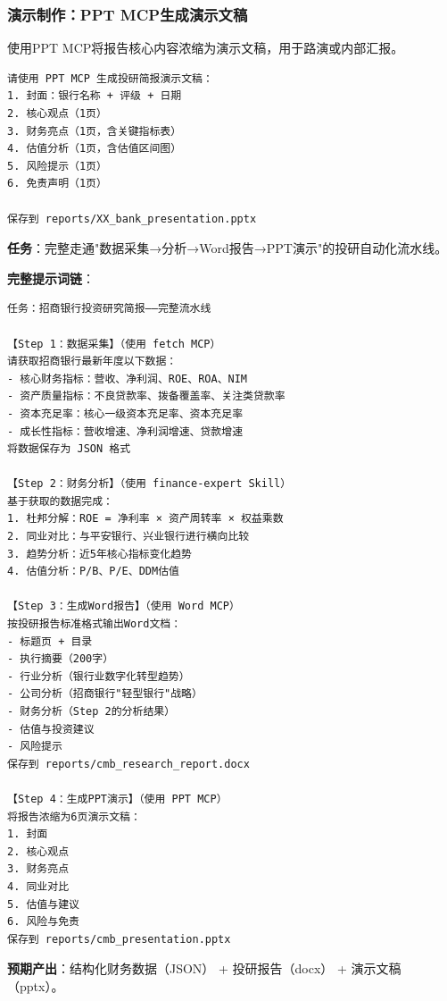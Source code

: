 \subsubsection{演示制作：PPT MCP生成演示文稿}

使用PPT MCP将报告核心内容浓缩为演示文稿，用于路演或内部汇报。

\begin{lstlisting}
请使用 PPT MCP 生成投研简报演示文稿：
1. 封面：银行名称 + 评级 + 日期
2. 核心观点（1页）
3. 财务亮点（1页，含关键指标表）
4. 估值分析（1页，含估值区间图）
5. 风险提示（1页）
6. 免责声明（1页）

保存到 reports/XX_bank_presentation.pptx
\end{lstlisting}

\begin{practicebox}[实操：生成某上市银行投研简报]
\textbf{任务}：完整走通"数据采集→分析→Word报告→PPT演示"的投研自动化流水线。

\textbf{完整提示词链}：

\begin{lstlisting}
任务：招商银行投资研究简报——完整流水线

【Step 1：数据采集】（使用 fetch MCP）
请获取招商银行最新年度以下数据：
- 核心财务指标：营收、净利润、ROE、ROA、NIM
- 资产质量指标：不良贷款率、拨备覆盖率、关注类贷款率
- 资本充足率：核心一级资本充足率、资本充足率
- 成长性指标：营收增速、净利润增速、贷款增速
将数据保存为 JSON 格式

【Step 2：财务分析】（使用 finance-expert Skill）
基于获取的数据完成：
1. 杜邦分解：ROE = 净利率 × 资产周转率 × 权益乘数
2. 同业对比：与平安银行、兴业银行进行横向比较
3. 趋势分析：近5年核心指标变化趋势
4. 估值分析：P/B、P/E、DDM估值

【Step 3：生成Word报告】（使用 Word MCP）
按投研报告标准格式输出Word文档：
- 标题页 + 目录
- 执行摘要（200字）
- 行业分析（银行业数字化转型趋势）
- 公司分析（招商银行"轻型银行"战略）
- 财务分析（Step 2的分析结果）
- 估值与投资建议
- 风险提示
保存到 reports/cmb_research_report.docx

【Step 4：生成PPT演示】（使用 PPT MCP）
将报告浓缩为6页演示文稿：
1. 封面
2. 核心观点
3. 财务亮点
4. 同业对比
5. 估值与建议
6. 风险与免责
保存到 reports/cmb_presentation.pptx
\end{lstlisting}

\textbf{预期产出}：结构化财务数据（JSON） + 投研报告（docx） + 演示文稿（pptx）。
\end{practicebox}

